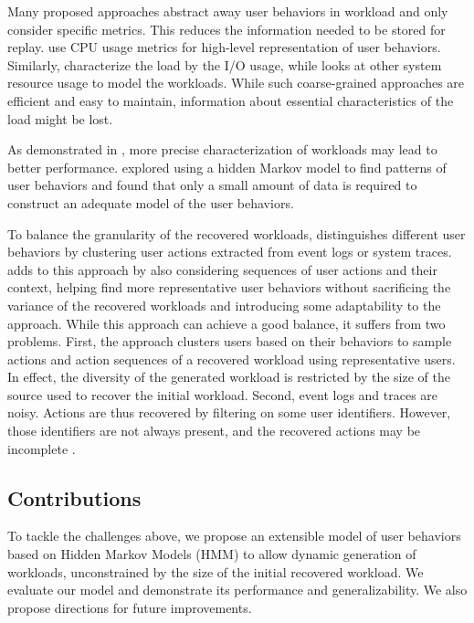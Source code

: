 Many proposed approaches abstract away user behaviors in workload and only consider specific metrics. This reduces the information needed to be stored for replay. \cite{Shang2015-gj, Cohen2005-mn} use CPU usage metrics for high-level representation of user behaviors. Similarly, \cite{Haghdoost2017-bc, Yadwadkar2010-ml, Busch2015-yo, Seo2014-xv} characterize the load by the I/O usage, while \cite{Cortez2017-nc} looks at other system resource usage to model the workloads. While such coarse-grained approaches are efficient and easy to maintain, information about essential characteristics of the load might be lost.

As demonstrated in \cite{Cohen2005-mn}, more precise characterization of workloads may lead to better performance. \cite{Yadwadkar2010-ml} explored using a hidden Markov model to find patterns of user behaviors and found that only a small amount of data is required to construct an adequate model of the user behaviors.

To balance the granularity of the recovered workloads, \cite{Syer2017-ek, Vogele2018-zz, Summers2016-jj, Xi2011-ki, Hassan2008-nj} distinguishes different user behaviors by clustering user actions extracted from event logs or system traces. \cite{Chen2019-fu} adds to this approach by also considering sequences of user actions and their context, helping find more representative user behaviors without sacrificing the variance of the recovered workloads and introducing some adaptability to the approach. While this approach can achieve a good balance, it suffers from two problems. First, the approach clusters users based on their behaviors to sample actions and action sequences of a recovered workload using representative users. In effect, the diversity of the generated workload is restricted by the size of the source used to recover the initial workload. Second, event logs and traces are noisy. Actions are thus recovered by filtering on some user identifiers. However, those identifiers are not always present, and the recovered actions may be incomplete \cite{Zhao2023-nh}.

\subsection{Contributions}

To tackle the challenges above, we propose an extensible model of user behaviors based on Hidden Markov Models (HMM) to allow dynamic generation of workloads, unconstrained by the size of the initial recovered workload. We evaluate our model and demonstrate its performance and generalizability. We also propose directions for future improvements.

